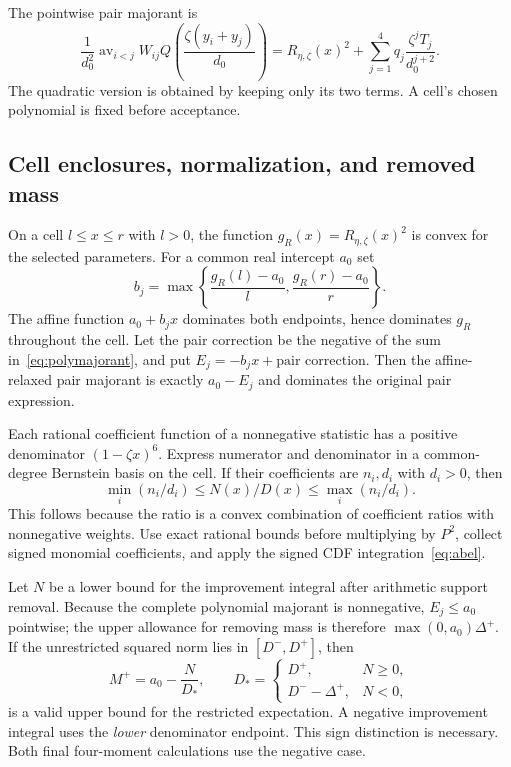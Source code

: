 \documentclass[11pt,a4paper]{article}
\theoremstyle{definition}\newtheorem{definition}[theorem]{Definition}
\theoremstyle{remark}\newtheorem{remark}[theorem]{Remark}
\newcommand{\av}{\operatorname{av}}
\numberwithin{equation}{section}
\begin{document}
The pointwise pair majorant is
\begin{equation}\label{eq:polymajorant}
 \frac1{d_0^2}\av_{i<j}W_{ij}Q\left(\frac{\zeta(y_i+y_j)}{d_0}\right)
 =R_{\eta,\zeta}(x)^2+\sum_{j=1}^4q_j\frac{\zeta^jT_j}{d_0^{j+2}}.
\end{equation}
The quadratic version is obtained by keeping only its two terms. A cell's chosen polynomial is fixed before acceptance.

\subsection{Cell enclosures, normalization, and removed mass}
On a cell $l\le x\le r$ with $l>0$, the function $g_R(x)=R_{\eta,\zeta}(x)^2$ is convex for the selected parameters. For a common real intercept $a_0$ set
\[
 b_j=\max\left\{\frac{g_R(l)-a_0}{l},\frac{g_R(r)-a_0}{r}\right\}.
\]
The affine function $a_0+b_jx$ dominates both endpoints, hence dominates $g_R$ throughout the cell. Let the pair correction be the negative of the sum in~\eqref{eq:polymajorant}, and put
$E_j=-b_jx+\text{pair correction}$. Then the affine-relaxed pair majorant is exactly $a_0-E_j$ and dominates the original pair expression.

Each rational coefficient function of a nonnegative statistic has a positive denominator $(1-\zeta x)^6$. Express numerator and denominator in a common-degree Bernstein basis on the cell. If their coefficients are $n_i,d_i$ with $d_i>0$, then
\[
 \min_i(n_i/d_i)\le N(x)/D(x)\le\max_i(n_i/d_i).
\]
This follows because the ratio is a convex combination of coefficient ratios with nonnegative weights. Use exact rational bounds before multiplying by $P^2$, collect signed monomial coefficients, and apply the signed CDF integration~\eqref{eq:abel}.

Let $N$ be a lower bound for the improvement integral after arithmetic support removal. Because the complete polynomial majorant is nonnegative, $E_j\le a_0$ pointwise; the upper allowance for removing mass is therefore $\max(0,a_0)\Delta^+$. If the unrestricted squared norm lies in $[D^-,D^+]$, then
\begin{equation}\label{eq:normcorrection}
 M^+=a_0-\frac{N}{D_*},\qquad
 D_*=
 \begin{cases}D^+,&N\ge0,\\D^- -\Delta^+,&N<0,\end{cases}
\end{equation}
is a valid upper bound for the restricted expectation. A negative improvement integral uses the \emph{lower} denominator endpoint. This sign distinction is necessary. Both final four-moment calculations use the negative case.
\end{document}
